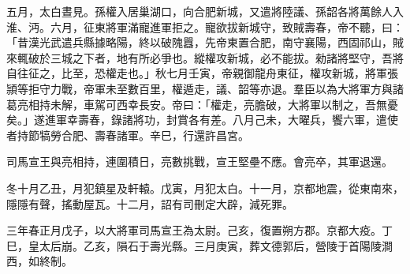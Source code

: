 \begin{pinyinscope}
 
 
 
 五月，太白晝見。孫權入居巢湖口，向合肥新城，又遣將陸議、孫韶各將萬餘人入淮、沔。六月，征東將軍滿寵進軍拒之。寵欲拔新城守，致賊壽春，帝不聽，曰：「昔漢光武遣兵縣據略陽，終以破隗囂，先帝東置合肥，南守襄陽，西固祁山，賊來輒破於三城之下者，地有所必爭也。縱權攻新城，必不能拔。勑諸將堅守，吾將自往征之，比至，恐權走也。」秋七月壬寅，帝親御龍舟東征，權攻新城，將軍張頴等拒守力戰，帝軍未至數百里，權遁走，議、韶等亦退。羣臣以為大將軍方與諸葛亮相持未解，車駕可西幸長安。帝曰：「權走，亮膽破，大將軍以制之，吾無憂矣。」遂進軍幸壽春，錄諸將功，封賞各有差。八月己未，大曜兵，饗六軍，遣使者持節犒勞合肥、壽春諸軍。辛巳，行還許昌宮。
 
 
 
 
 司馬宣王與亮相持，連圍積日，亮數挑戰，宣王堅壘不應。會亮卒，其軍退還。
 
 
 
 
 冬十月乙丑，月犯鎮星及軒轅。戊寅，月犯太白。十一月，京都地震，從東南來，隱隱有聲，搖動屋瓦。十二月，詔有司刪定大辟，減死罪。
 
 
三年春正月戊子，以大將軍司馬宣王為太尉。己亥，復置朔方郡。京都大疫。丁巳，皇太后崩。乙亥，隕石于壽光縣。三月庚寅，葬文德郭后，營陵于首陽陵澗西，如終制。
 

\end{pinyinscope}

